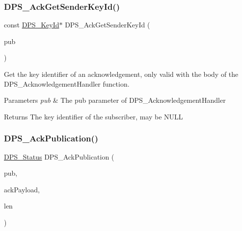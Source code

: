\subsubsection{\texorpdfstring{D\+P\+S\+\_\+\+Ack\+Get\+Sender\+Key\+Id()}{DPS\_AckGetSenderKeyId()}}
{\footnotesize\ttfamily const \hyperlink{group__keystore_ga4345e29dd2ad5d7fd88a1e988787bd72}{D\+P\+S\+\_\+\+Key\+Id}$\ast$ D\+P\+S\+\_\+\+Ack\+Get\+Sender\+Key\+Id (\begin{DoxyParamCaption}\item[{const \hyperlink{group__publication_ga0d439693474aa54e27f3d45a054696ac}{D\+P\+S\+\_\+\+Publication} $\ast$}]{pub }\end{DoxyParamCaption})}



Get the key identifier of an acknowledgement, only valid with the body of the D\+P\+S\+\_\+\+Acknowledgement\+Handler function. 


\begin{DoxyParams}{Parameters}
{\em pub} & The pub parameter of D\+P\+S\+\_\+\+Acknowledgement\+Handler\\
\hline
\end{DoxyParams}
\begin{DoxyReturn}{Returns}
The key identifier of the subscriber, may be N\+U\+LL 
\end{DoxyReturn}
\mbox{\label{group__publication_ga308074429a566ffb8d04d55bae520b04}} 
\subsubsection{\texorpdfstring{D\+P\+S\+\_\+\+Ack\+Publication()}{DPS\_AckPublication()}}
{\footnotesize\ttfamily \hyperlink{group__status_ga30395a84d3cad9d4ec29848106415038}{D\+P\+S\+\_\+\+Status} D\+P\+S\+\_\+\+Ack\+Publication (\begin{DoxyParamCaption}\item[{const \hyperlink{group__publication_ga0d439693474aa54e27f3d45a054696ac}{D\+P\+S\+\_\+\+Publication} $\ast$}]{pub,  }\item[{const uint8\+\_\+t $\ast$}]{ack\+Payload,  }\item[{size\+\_\+t}]{len }\end{DoxyParamCaption})}



